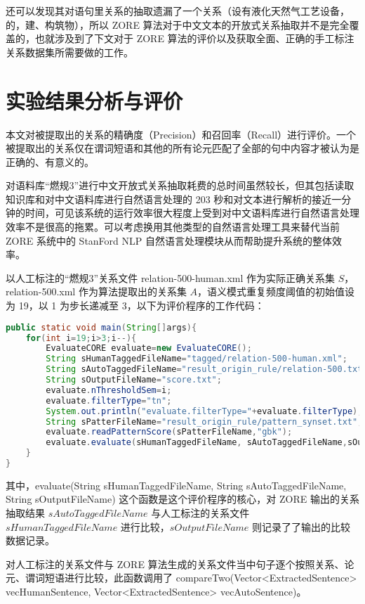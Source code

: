 还可以发现其对语句里关系的抽取遗漏了一个关系（设有液化天然气工艺设备，的，建、构筑物），所以 ZORE 算法对于中文文本的开放式关系抽取并不是完全覆盖的，也就涉及到了下文对于 ZORE 算法的评价以及获取全面、正确的手工标注关系数据集所需要做的工作。

\section{实验结果分析与评价}
本文对被提取出的关系的精确度（Precision）和召回率（Recall）进行评价。一个被提取出的关系仅在谓词短语和其他的所有论元匹配了全部的句中内容才被认为是正确的、有意义的。

对语料库“燃规3”进行中文开放式关系抽取耗费的总时间虽然较长，但其包括读取知识库和对中文语料库进行自然语言处理的 203 秒和对文本进行解析的接近一分钟的时间，可见该系统的运行效率很大程度上受到对中文语料库进行自然语言处理效率不是很高的拖累。可以考虑换用其他类型的自然语言处理工具来替代当前 ZORE 系统中的 StanFord NLP 自然语言处理模块从而帮助提升系统的整体效率。

以人工标注的“燃规3”关系文件 relation-500-human.xml 作为实际正确关系集 $S$，relation-500.xml 作为算法提取出的关系集 $A$，语义模式重复频度阈值的初始值设为 19，以 1 为步长递减至 3，以下为评价程序的工作代码：

\begin{lstlisting}[language=java, caption=评价程序, breaklines=true, label={code:evaluate}]
public static void main(String[]args){
    for(int i=19;i>3;i--){
        EvaluateCORE evaluate=new EvaluateCORE();
        String sHumanTaggedFileName="tagged/relation-500-human.xml";
        String sAutoTaggedFileName="result_origin_rule/relation-500.txt";
        String sOutputFileName="score.txt";
        evaluate.nThresholdSem=i;
        evaluate.filterType="tn";
        System.out.println("evaluate.filterType="+evaluate.filterType);
        String sPatterFileName="result_origin_rule/pattern_synset.txt";
        evaluate.readPatternScore(sPatterFileName,"gbk");
        evaluate.evaluate(sHumanTaggedFileName, sAutoTaggedFileName,sOutputFileName);
    }
}
\end{lstlisting}

其中，evaluate(String sHumanTaggedFileName, String sAutoTaggedFileName, String sOutputFileName) 这个函数是这个评价程序的核心，对 ZORE 输出的关系抽取结果 $sAutoTaggedFileName$ 与人工标注的关系文件 $sHumanTaggedFileName$ 进行比较，$sOutputFileName$ 则记录了了输出的比较数据记录。

对人工标注的关系文件与 ZORE 算法生成的关系文件当中句子逐个按照关系、论元、谓词短语进行比较，此函数调用了 compareTwo(Vector<ExtractedSentence> vecHumanSentence, Vector<ExtractedSentence> vecAutoSentence)。

